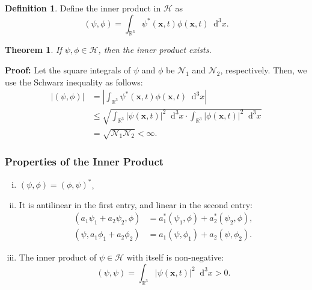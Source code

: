 \documentclass[12pt]{article}
\newcommand{\Diff}[1]{\mathop{}\!\mathrm{d}^{#1}}
\newtheorem{theorem}{Theorem}[section]
\theoremstyle{definition}
\newtheorem{definition}{Definition}[section]
\theoremstyle{remark}
\begin{document}
\begin{definition}
	Define the inner product in $\mathcal{H}$ as
	\[
		(\psi, \phi) = \int_{\mathbb{R}^3} \psi^{\ast}(\mathbf{x}, t) \phi(\mathbf{x}, t)\Diff3 x
	.\]
\end{definition}

\begin{theorem}
	If $\psi, \phi \in \mathcal{H}$, then the inner product exists.
\end{theorem}

\begin{adjustbox}{minipage = \columnwidth - 25.5pt, margin=1em, frame=1pt, margin=0em}
\textbf{Proof:} Let the square integrals of $\psi$ and $\phi$ be $\mathcal{N}_1$ and $\mathcal{N}_2$, respectively. Then, we use the Schwarz inequality as follows:
\begin{align*}
	|(\psi, \phi)| &= \left| \int_{\mathbb{R}^3} \psi^{\ast}(\mathbf{x}, t) \phi(\mathbf{x}, t) \Diff3 x \right| \\
		       &\leq \sqrt{\int_{\mathbb{R}^3} |\psi(\mathbf{x}, t)|^2\Diff3 x \cdot \int_{\mathbb{R}^3}|\phi(\mathbf{x}, t)|^2\Diff3 x} \\
		       &= \sqrt{\mathcal{N}_1\mathcal{N}_2} < \infty.
\end{align*}
\end{adjustbox}

\subsubsection{Properties of the Inner Product}%
\label{subsub:properties_of_the_inner_product}

\begin{enumerate}[(i)]
	\item $(\psi, \phi) = (\phi, \psi)^{\ast}$,
	\item It is antilinear in the first entry, and linear in the second entry:
		\begin{align*}
			(a_1 \psi_1 +a_2 \psi_2, \phi) &= a_1^{\ast}(\psi_1, \phi) + a_2^{\ast}(\psi_2, \phi), \\
			(\psi, a_1 \phi_1 + a_2 \phi_2) &= a_1(\psi, \phi_1) + a_2(\psi, \phi_2).
		\end{align*}
	\item The inner product of $\psi \in \mathcal{H}$ with itself is non-negative:
		\[
			(\psi, \psi) = \int_{\mathbb{R}^3} |\psi(\mathbf{x}, t)|^2 \Diff3 x > 0
		.\]
\end{enumerate}
\end{document}
